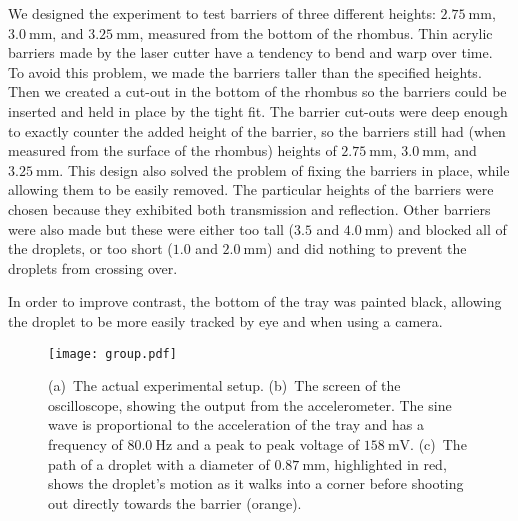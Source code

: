 We designed the experiment to test barriers of three different heights: $2.75~\mathrm{mm}$, $3.0~\mathrm{mm}$, and $3.25~\mathrm{mm}$, measured from the bottom of the rhombus. Thin acrylic barriers made by the laser cutter have a tendency to bend and warp over time. To avoid this problem, we made the barriers taller than the specified heights. Then we created a cut-out in the bottom of the rhombus so the barriers could be inserted and held in place by the tight fit. The barrier cut-outs were deep enough to exactly counter the added height of the barrier, so the barriers still had (when measured from the surface of the rhombus) heights of $2.75~\mathrm{mm}$, $3.0~\mathrm{mm}$, and $3.25~\mathrm{mm}$. This design also solved the problem of fixing the barriers in place, while allowing them to be easily removed. The particular heights of the barriers were chosen because they exhibited both transmission and reflection. Other barriers were also made but these were either too tall ($3.5$ and $4.0~\mathrm{mm}$) and blocked all of the droplets, or too short ($1.0$ and $2.0~\mathrm{mm}$) and did nothing to prevent the droplets from crossing over.

In order to improve contrast, the bottom of the tray was painted black, allowing the droplet to be more easily tracked by eye and when using a camera.

\begin{figure}[h!]
	\centering
	\texttt{[image: group.pdf]}
	\caption{(a)~The actual experimental setup. 
	(b)~The screen of the oscilloscope, showing the output from the accelerometer. The sine wave is proportional to the acceleration of the tray and has a frequency of $80.0~\mathrm{Hz}$ and a peak to peak voltage of $158~\mathrm{mV}$. 
	(c)~The path of a droplet with a diameter of $0.87~\mathrm{mm}$, highlighted in red, shows the droplet's motion as it walks into a corner before shooting out directly towards the barrier (orange).}
	\label{group}
\end{figure}

